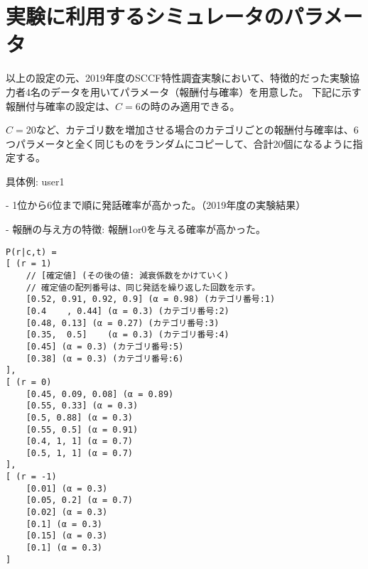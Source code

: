 \documentclass[11pt,a4paper]{jsarticle}
\begin{document}
\newpage

\section{実験に利用するシミュレータのパラメータ}

以上の設定の元、2019年度のSCCF特性調査実験において、特徴的だった実験協力者4名のデータを用いてパラメータ（報酬付与確率）を用意した。
下記に示す報酬付与確率の設定は、$C=6$の時のみ適用できる。\par
$C=20$など、カテゴリ数を増加させる場合のカテゴリごとの報酬付与確率は、6つパラメータと全く同じものをランダムにコピーして、合計20個になるように指定する。\par
\par

具体例: user1\par
- 1位から6位まで順に発話確率が高かった。（2019年度の実験結果）\par
- 報酬の与え方の特徴: 報酬1or0を与える確率が高かった。\par
\begin{lstlisting}
P(r|c,t) =
[ (r = 1)
    // [確定値] (その後の値: 減衰係数をかけていく)
    // 確定値の配列番号は、同じ発話を繰り返した回数を示す。
    [0.52, 0.91, 0.92, 0.9] (α = 0.98) (カテゴリ番号:1)
    [0.4	, 0.44] (α = 0.3) (カテゴリ番号:2)
    [0.48, 0.13] (α = 0.27) (カテゴリ番号:3)	
    [0.35,	0.5]	(α = 0.3) (カテゴリ番号:4)
    [0.45] (α = 0.3) (カテゴリ番号:5)
    [0.38] (α = 0.3) (カテゴリ番号:6)
],
[ (r = 0)
    [0.45, 0.09, 0.08] (α = 0.89)
    [0.55, 0.33] (α = 0.3)
    [0.5, 0.88]	(α = 0.3)
    [0.55, 0.5]	(α = 0.91)
    [0.4, 1, 1] (α = 0.7)
    [0.5, 1, 1] (α = 0.7)
],
[ (r = -1)
    [0.01] (α = 0.3)
    [0.05, 0.2] (α = 0.7)	
    [0.02] (α = 0.3)	
    [0.1] (α = 0.3)	
    [0.15] (α = 0.3)
    [0.1] (α = 0.3)
]
\end{lstlisting}
\end{document}
